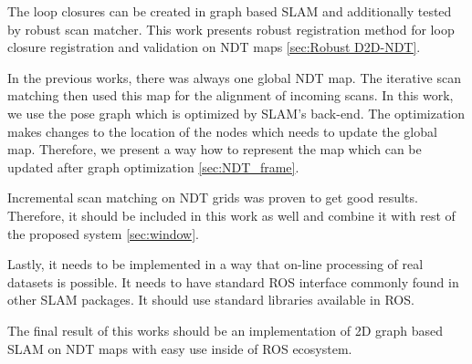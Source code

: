The loop closures can be created in graph based \gls{SLAM} and additionally tested by robust scan matcher. This work presents robust registration method for loop closure registration and validation on \gls{NDT} maps \ref{sec:Robust D2D-NDT}.

In the previous works, there was always one global \gls{NDT} map. The iterative scan matching then used this map for the alignment of incoming scans. In this work, we use the pose graph which is optimized by \gls{SLAM}'s back-end. The optimization makes changes to the location of the nodes which needs to update the global map. Therefore, we present a way how to represent the map which can be updated after graph optimization \ref{sec:NDT_frame}.

Incremental scan matching on \gls{NDT} grids was proven to get good results. Therefore, it should be included in this work as well and combine it with rest of the proposed system \ref{sec:window}.   

Lastly, it needs to be implemented in a way that on-line processing of real datasets is possible. It needs to have standard \gls{ROS} interface commonly found in other \gls{SLAM} packages. It should use standard libraries available in \gls{ROS}.

The final result of this works should be an implementation of 2D graph based \gls{SLAM} on \gls{NDT} maps with easy use inside of \gls{ROS} ecosystem. 